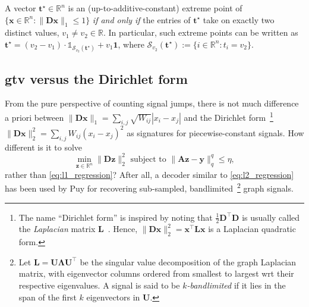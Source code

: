 \begin{proposition}\label{prop:extreme_points_gtv_ball}
    A vector $\mathbf{t}^\star \in \mathbb{R}^{n}$ is an (up-to-additive-constant) extreme point of $\{ \mathbf{x} \in \mathbb{R}^{n} : \| \mathbf{Dx} \|_1 \leq 1\}$ \emph{if and only if} the entries of $\mathbf{t}^\star$ take on exactly two distinct values, $v_1 \neq v_2 \in \mathbb{R}$. In particular, such extreme points can be written as $\mathbf{t}^\star = (v_2 - v_1) \cdot \mathbb{1}_{\mathcal{S}_{v_2}(\mathbf{t}^\star)} + v_1 \mathbf{1}$, where $\mathcal{S}_{v_2}(\mathbf{t}^\star) := \{ i \in \mathbb{R}^{n} : t_i = v_2\}$.
\end{proposition}


\subsection{\texorpdfstring{\acrlong{gtv}}{Graph Total Variation} versus the Dirichlet form}\label{sec:gtv_versus_dirichlet}

From the pure perspective of counting signal jumps, there is not much difference a priori between $\| \mathbf{Dx}\|_1 = \sum_{i,j} \sqrt{W_{ij}} |x_i - x_j|$ and the Dirichlet form~\footnote{The name ``Dirichlet form'' is inspired by noting that $\frac{1}{2}\mathbf{D}^\top \mathbf{D}$ is usually called the \emph{Laplacian} matrix $\mathbf{L}$~\cite{shuman2013}. Hence, $\|\mathbf{Dx}\|_2^2 = \mathbf{x}^{\top} \mathbf{L} \mathbf{x}$ is a Laplacian quadratic form.} $\|\mathbf{Dx}\|_2^2 = \sum_{i,j} W_{ij} (x_i - x_j)^{2}$ as signatures for piecewise-constant signals. How different is it to solve
\begin{equation}\label{eq:l2_regression}
    \underset{\mathbf{z} \in \mathbb{R}^{n}}{\min} \| \mathbf{Dz} \|_2^2 \text{ subject to } \| \mathbf{Az - y} \|_q^q \leq \eta,
\end{equation}
rather than \eqref{eq:l1_regression}? After all, a decoder similar to \eqref{eq:l2_regression} has been used by Puy \etal \cite{puy2016} for recovering sub-sampled, bandlimited~\footnote{Let $\mathbf{L} = \mathbf{U} \bm{\Lambda} \mathbf{U}^\top$ be the singular value decomposition of the graph Laplacian matrix, with eigenvector columns ordered from smallest to largest \acrshort{wrt} their respective eigenvalues. A signal is said to be \emph{$k$-bandlimited} if it lies in the span of the first $k$ eigenvectors in $\mathbf{U}$.} graph signals.

